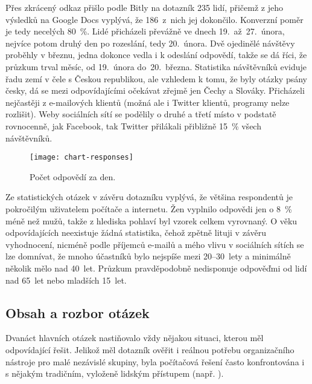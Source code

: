 \documentclass[12pt,oneside,final]{fithesis2}
\begin{document}
Přes zkrácený odkaz přišlo podle Bitly na dotazník 235 lidí, přičemž z jeho výsledků na Google Docs vyplývá, že 186~z~nich jej dokončilo. Konverzní poměr je tedy necelých 80~\%. Lidé přicházeli převážně ve dnech 19.~až~27.~února, nejvíce potom druhý den po rozeslání, tedy 20.~února. Dvě ojedinělé návštěvy proběhly v březnu, jedna dokonce vedla i k odeslání odpovědí, takže se dá říci, že průzkum trval měsíc, od 19.~února do~20.~března. Statistika návštěvníků eviduje řadu zemí v čele s Českou republikou, ale vzhledem k tomu, že byly otázky psány česky, dá se mezi odpovídajícími očekávat zřejmě jen Čechy a Slováky. Přicházeli nejčastěji z e-mailových klientů (možná ale i Twitter klientů, programy nelze rozlišit). Weby sociálních sítí se podělily o druhé a třetí místo v podstatě rovnocenně, jak Facebook, tak Twitter přilákali přibližně 15~\% všech návštěvníků.

\begin{figure}[h]
    \centering
    \texttt{[image: chart-responses]}
    \caption{Počet odpovědí za den.}
\end{figure}

Ze statistických otázek v závěru dotazníku vyplývá, že většina respondentů je pokročilým uživatelem počítače a internetu. Žen vyplnilo odpovědi jen o 8~\% méně než mužů, takže z hlediska pohlaví byl vzorek celkem vyrovnaný. O věku odpovídajících neexistuje žádná statistika, čehož zpětně lituji v závěru vyhodnocení, nicméně podle příjemců e-mailů a mého vlivu v sociálních sítích se lze domnívat, že mnoho účastníků bylo nejspíše mezi 20--30~lety a minimálně několik mělo nad 40~let. Průzkum pravděpodobně nedisponuje odpověďmi od lidí nad 65~let nebo mladších 15~let.

\subsection{Obsah a rozbor otázek}
Dvanáct hlavních otázek nastiňovalo vždy nějakou situaci, kterou měl odpovídající řešit. Jelikož měl dotazník ověřit i reálnou potřebu organizačního nástroje pro malé nezávislé skupiny, byla počítačová řešení často konfrontována i s nějakým tradičním, vyloženě lidským přístupem (např. ).
\end{document}
